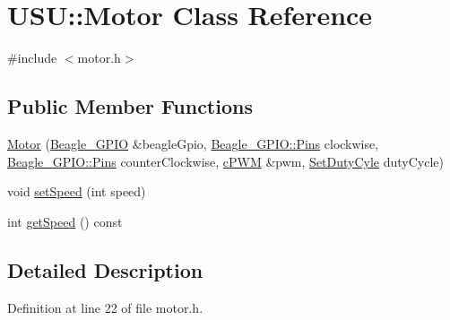 \hypertarget{class_u_s_u_1_1_motor}{\section{\-U\-S\-U\-:\-:\-Motor \-Class \-Reference}
\label{class_u_s_u_1_1_motor}
}


{\ttfamily \#include $<$motor.\-h$>$}

\subsection*{\-Public \-Member \-Functions}
\begin{DoxyCompactItemize}
\item 
\hyperlink{class_u_s_u_1_1_motor_a2200a3939cd62d2e22e9b134b54bc402}{\-Motor} (\hyperlink{class_beagle___g_p_i_o}{\-Beagle\-\_\-\-G\-P\-I\-O} \&beagle\-Gpio, \hyperlink{class_beagle___g_p_i_o_a9b1fd560ea5d2d65898ac15c23055e58}{\-Beagle\-\_\-\-G\-P\-I\-O\-::\-Pins} clockwise, \hyperlink{class_beagle___g_p_i_o_a9b1fd560ea5d2d65898ac15c23055e58}{\-Beagle\-\_\-\-G\-P\-I\-O\-::\-Pins} counter\-Clockwise, \hyperlink{classc_p_w_m}{c\-P\-W\-M} \&pwm, \hyperlink{motor_8h_aa4a2cd53d0866ae4c273573db3c4870d}{\-Set\-Duty\-Cyle} duty\-Cycle)
\item 
void \hyperlink{class_u_s_u_1_1_motor_aa58cbc26a0da87389dd208367d0fa407}{set\-Speed} (int speed)
\item 
int \hyperlink{class_u_s_u_1_1_motor_a98d4c98ddc30e00485712f55b4a91211}{get\-Speed} () const 
\end{DoxyCompactItemize}


\subsection{\-Detailed \-Description}


\-Definition at line 22 of file motor.\-h.



